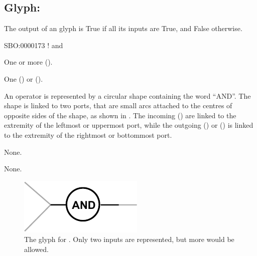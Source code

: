 \subsection{Glyph: }
\label{sec:and}


The output of an  glyph is True if all its inputs are True, and False otherwise.



\begin{glyphDescription}

\glyphSboTerm
SBO:0000173 ! and


\glyphIncoming One or more  ().



\glyphOutgoing
One  () or  ().


\glyphContainer
An  operator is represented by a circular shape containing the word ``AND''.
The shape is linked to two ports, that are small arcs attached to the centres of opposite sides of the shape, as shown in .
The incoming  () are linked to the extremity of the leftmost or uppermost port, while the outgoing  () or  () is linked to the extremity of the rightmost or bottommost port.

\glyphLabel
None.

\glyphAux
None.

\end{glyphDescription}

\begin{figure}[H]
  \centering
  \includegraphics{images/and}
  \caption{The \PD glyph for . Only two inputs are represented, but more would be allowed.}
  \label{fig:and}
\end{figure}

%
